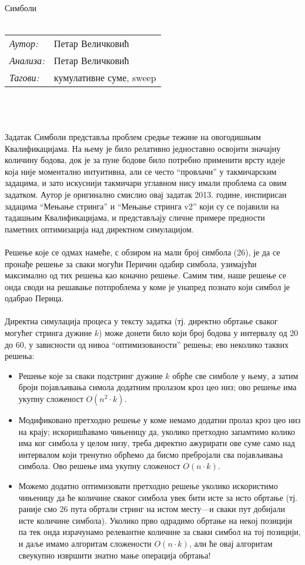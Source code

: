 \documentclass[a4wide]{article}
\begin{document}
 Симболи\\ \\
%
\begin{tabular}{l l}
{\it Аутор:} & Петар Величковић\\
{\it Анализа:} & Петар Величковић\\
{\it Тагови:} & кумулативне суме, sweep\\
\end{tabular}\\ \\ \\
%
 Задатак Симболи представља проблем средње тежине на овогодишњим Квалификацијама. На њему је било релативно једноставно освојити значајну количину бодова, док је за пуне бодове било потребно применити врсту идеје која није моментално интуитивна, али се често ``провлачи'' у такмичарским задацима, и зато искуснији такмичари углавном нису имали проблема са овим задатком. Аутор је оригинално смислио овај задатак 2013. године, инспирисан задацима ``Мењање стринга'' и ``Мењање стринга v2'' који су се појавили на тадашњим Квалификацијама, и представљају сличне примере предности паметних оптимизација над директном симулацијом.\\ \\
Решење које се одмах намеће, с обзиром на мали број симбола (26), је да се пронађе решење за сваки могући Перичин одабир симбола, узимајући максимално од тих решења као коначно решење. Самим тим, наше решење се онда своди на решавање потпроблема у коме је унапред познато који симбол је одабрао Перица.\\ \\
Директна симулација процеса у тексту задатка (тј. директно обртање сваког могућег стринга дужине $k$) може донети било који број бодова у интервалу од 20 до 60, у зависности од нивоа ``оптимизованости'' решења; ево неколико таквих решења: 
\begin{itemize}
	\item Решење које за сваки подстринг дужине $k$ обрће све симболе у њему, а затим броји појављивања симола додатним пролазом кроз цео низ; ово решење има укупну сложеност $O(n^2 \cdot k)$.
	\item Модификовано претходно решење у коме немамо додатни пролаз кроз цео низ на крају; искоришћавамо чињеницу да, уколико претходно запамтимо колико има ког симбола у целом низу, треба директно ажурирати ове суме само над интервалом који тренутно обрћемо да бисмо пребројали сва појављивања симбола. Ово решење има укупну сложеност $O(n\cdot k)$.
	\item Можемо додатно оптимизовати претходно решење уколико искористимо чињеницу да ће количине сваког симбола увек бити исте за исто обртање (тј. раније смо 26 пута обртали стринг на истом месту---и сваки пут добијали исте количине симбола). Уколико прво одрадимо обртање на некој позицији па тек онда израчунамо релевантне количине за сваки симбол на тој позицији, и даље имамо алгоритам сложености $O(n\cdot k)$, али ће овај алгоритам свеукупно извршити знатно мање операција обртања!
\end{itemize}
\end{document}
